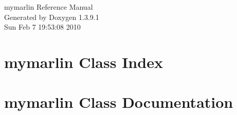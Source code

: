 \documentclass[a4paper]{book}
\begin{document}
\begin{titlepage}
\vspace*{7cm}
\begin{center}
{\Large mymarlin Reference Manual}\\
\vspace*{1cm}
{\large Generated by Doxygen 1.3.9.1}\\
\vspace*{0.5cm}
{\small Sun Feb 7 19:53:08 2010}\\
\end{center}
\end{titlepage}
\clearemptydoublepage
{}
\tableofcontents
\clearemptydoublepage
{}
\chapter{mymarlin Class Index}

\chapter{mymarlin Class Documentation}

\printindex
\end{document}
